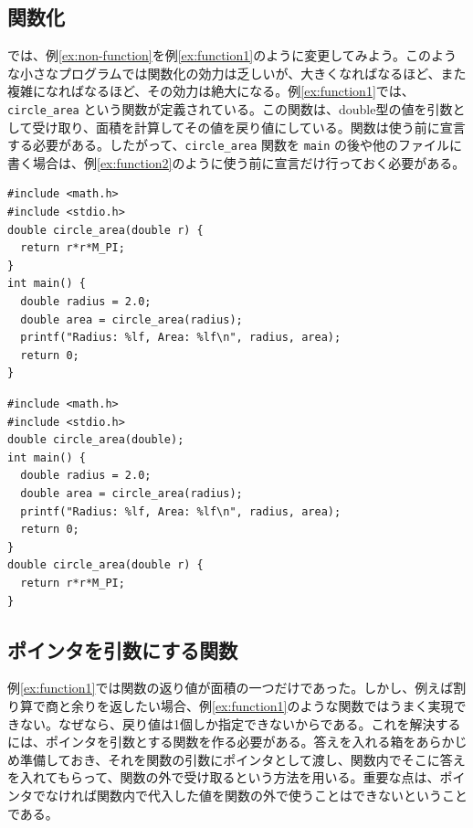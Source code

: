 \subsection{関数化}
では、例\ref{ex:non-function}を例\ref{ex:function1}のように変更してみよう。このような小さなプログラムでは関数化の効力は乏しいが、大きくなればなるほど、また複雑になればなるほど、その効力は絶大になる。例\ref{ex:function1}では、\verb|circle_area| という関数が定義されている。この関数は、double型の値を引数として受け取り、面積を計算してその値を戻り値にしている。関数は使う前に宣言する必要がある。したがって、\verb|circle_area| 関数を \verb|main| の後や他のファイルに書く場合は、例\ref{ex:function2}のように使う前に宣言だけ行っておく必要がある。
\begin{reidai}\label{ex:function1}
\begin{verbatim}
#include <math.h>
#include <stdio.h>
double circle_area(double r) {
  return r*r*M_PI;
}
int main() {
  double radius = 2.0;
  double area = circle_area(radius);
  printf("Radius: %lf, Area: %lf\n", radius, area);
  return 0;
}
\end{verbatim}
\end{reidai}
\begin{reidai}\label{ex:function2}
\begin{verbatim}
#include <math.h>
#include <stdio.h>
double circle_area(double);
int main() {
  double radius = 2.0;
  double area = circle_area(radius);
  printf("Radius: %lf, Area: %lf\n", radius, area);
  return 0;
} 
double circle_area(double r) {
  return r*r*M_PI;
}
\end{verbatim}
\end{reidai}

\subsection{ポインタを引数にする関数}

例\ref{ex:function1}では関数の返り値が面積の一つだけであった。しかし、例えば割り算で商と余りを返したい場合、例\ref{ex:function1}のような関数ではうまく実現できない。なぜなら、戻り値は1個しか指定できないからである。これを解決するには、ポインタを引数とする関数を作る必要がある。答えを入れる箱をあらかじめ準備しておき、それを関数の引数にポインタとして渡し、関数内でそこに答えを入れてもらって、関数の外で受け取るという方法を用いる。重要な点は、ポインタでなければ関数内で代入した値を関数の外で使うことはできないということである。

